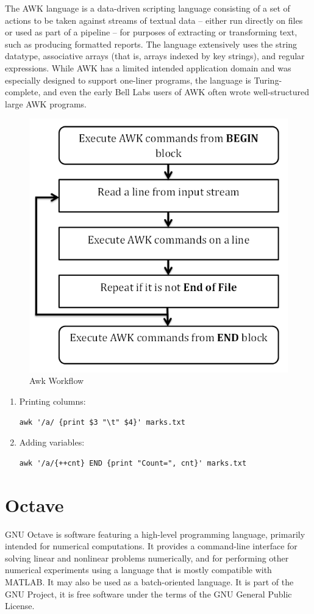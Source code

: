 \documentclass{article}
\begin{document}
The AWK language is a data-driven scripting language consisting of a set of actions to be taken against streams of textual data – either run directly on files or used as part of a pipeline – for purposes of extracting or transforming text, such as producing formatted reports. The language extensively uses the string datatype, associative arrays (that is, arrays indexed by key strings), and regular expressions. While AWK has a limited intended application domain and was especially designed to support one-liner programs, the language is Turing-complete, and even the early Bell Labs users of AWK often wrote well-structured large AWK programs.
\begin{figure}[!h]
	\begin{center}
		\includegraphics[width=0.4\columnwidth]{awk_workflow}
	\end{center}
	\caption{Awk Workflow}
        \label{fig:shapes}
\end{figure}
    \begin{enumerate}
        \item
            Printing columns:
                \begin{lstlisting}[style=BashInputStyle]
                     awk '/a/ {print $3 "\t" $4}' marks.txt 
                \end{lstlisting}
        \item
            Adding variables:
                \begin{lstlisting}[style=BashInputStyle]
                     awk '/a/{++cnt} END {print "Count=", cnt}' marks.txt
                \end{lstlisting}
  \end{enumerate}

    \section{Octave}
GNU Octave is software featuring a high-level programming language, primarily intended for numerical computations. It provides a command-line interface for solving linear and nonlinear problems numerically, and for performing other numerical experiments using a language that is mostly compatible with MATLAB. It may also be used as a batch-oriented language. It is part of the GNU Project, it is free software under the terms of the GNU General Public License.
\end{document}
